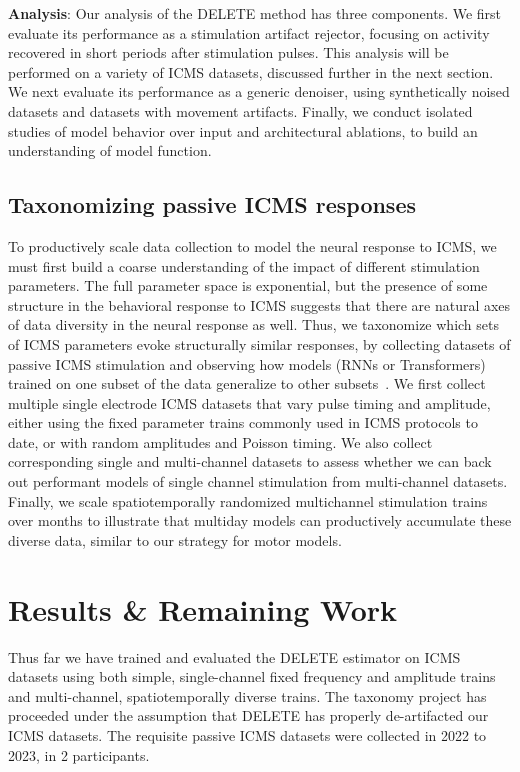 \documentclass[12pt,oneside]{report}
\begin{document}
\textbf{Analysis}: Our analysis of the DELETE method has three components. We first evaluate its performance as a stimulation artifact rejector, focusing on activity recovered in short periods after stimulation pulses. This analysis will be performed on a variety of ICMS datasets, discussed further in the next section. We next evaluate its performance as a generic denoiser, using synthetically noised datasets and datasets with movement artifacts. Finally, we conduct isolated studies of model behavior over input and architectural ablations, to build an understanding of model function.


\subsection*{Taxonomizing passive ICMS responses}
To productively scale data collection to model the neural response to ICMS, we must first build a coarse understanding of the impact of different stimulation parameters. The full parameter space is exponential, but the presence of some structure in the behavioral response to ICMS suggests that there are natural axes of data diversity in the neural response as well. Thus, we taxonomize which sets of ICMS parameters evoke structurally similar responses, by collecting datasets of passive ICMS stimulation and observing how models (RNNs or Transformers) trained on one subset of the data generalize to other subsets~\citep{zamir2018taskonomy}. We first collect multiple single electrode ICMS datasets that vary pulse timing and amplitude, either using the fixed parameter trains commonly used in ICMS protocols to date, or with random amplitudes and Poisson timing. We also collect corresponding single and multi-channel datasets to assess whether we can back out performant models of single channel stimulation from multi-channel datasets. Finally, we scale spatiotemporally randomized multichannel stimulation trains over months to illustrate that multiday models can productively accumulate these diverse data, similar to our strategy for motor models.


\section{Results \& Remaining Work}
Thus far we have trained and evaluated the DELETE estimator on ICMS datasets using both simple, single-channel fixed frequency and amplitude trains and multi-channel, spatiotemporally diverse trains. The taxonomy project has proceeded under the assumption that DELETE has properly de-artifacted our ICMS datasets. The requisite passive ICMS datasets were collected in 2022 to 2023, in 2 participants.
\end{document}
